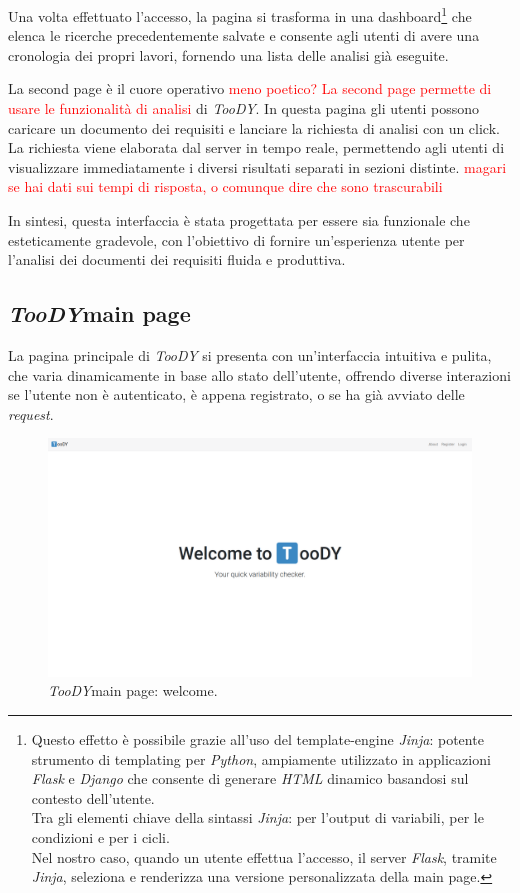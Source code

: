 \documentclass[12pt]{report}
\newcommand{\torevise}[1]{\textcolor{red}{#1}}
\newcommand{\toody}{\textsl{TooDY}\xspace}
\newcommand{\python}{\textsl{Python}\xspace}
\newcommand{\jinja}{\textsl{Jinja}\xspace}
\newcommand{\flask}{\textsl{Flask}\xspace}
\newcommand{\django}{\textsl{Django}\xspace}
\newcommand{\html}{\textsl{HTML}\xspace}
\begin{document}
Una volta effettuato l'accesso, la pagina si trasforma in una dashboard\footnote{Questo effetto è possibile grazie all'uso del template-engine \jinja: potente strumento di templating per \python, ampiamente utilizzato in applicazioni \flask e \django che consente di generare \html dinamico basandosi sul contesto dell'utente.\\
Tra gli elementi chiave della sintassi \jinja: \texttt{\string{\string{ \string}\string}} per l'output di variabili, \texttt{} per le condizioni e \texttt{} per i cicli.\\
Nel nostro caso, quando un utente effettua l'accesso, il server \flask, tramite \jinja, seleziona e renderizza una versione personalizzata della main page.} che elenca le ricerche precedentemente salvate e consente agli utenti di avere una cronologia dei propri lavori, fornendo una lista delle analisi già eseguite.

La \textsf{second page} è il cuore operativo \torevise{meno poetico? La \textsf{second page} permette di usare le funzionalità di analisi} di \toody. In questa pagina gli utenti possono caricare un documento dei requisiti e lanciare la richiesta di analisi con un click. La richiesta viene elaborata dal server in tempo reale, permettendo agli utenti di visualizzare immediatamente i diversi risultati separati in sezioni distinte. \torevise{magari se hai dati sui tempi di risposta, o comunque dire che sono trascurabili}

In sintesi, questa interfaccia è stata progettata per essere sia funzionale che esteticamente gradevole, con l'obiettivo di fornire un'esperienza utente per l'analisi dei documenti dei requisiti fluida e produttiva.


\subsection{\toody \textsf{main page}}
La pagina principale di \toody si presenta con un'interfaccia intuitiva e pulita, che varia dinamicamente in base allo stato dell'utente, offrendo diverse interazioni se l'utente non è autenticato, è appena registrato, o se ha già avviato delle \textit{request}.

\begin{figure}[H]
\centering
\includegraphics[width=1.0\textwidth]{pagina1-welcome.png}
\caption{\toody \textsf{main page}: welcome.}
\label{fig:pagina1-login}
\end{figure}
\end{document}
